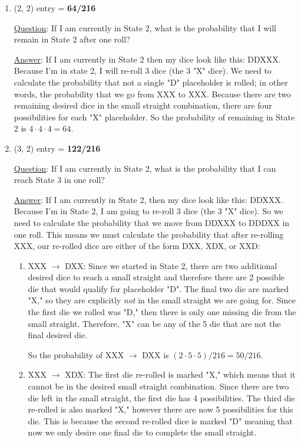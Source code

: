 \documentclass[12pt,a4paper]{article}
\begin{document}
    \begin{enumerate}
        \item (2, 2) entry = \textbf{64/216}

        \underline{Question}: If I am currently in State 2, what is the probability that I will remain in State 2 after one roll?

        \underline{Answer}: If I am currently in State 2 then my dice look like this: DDXXX. Because I'm in state 2, I will re-roll 3 dice (the 3 "X" dice). We need to calculate the probability that not a single "D" placeholder is rolled; in other words, the probability that we go from XXX to XXX.
        Because there are two remaining desired dice in the small straight combination, there are four possibilities for each "X" placeholder. So the probability of remaining in State 2 is $4 \cdot 4 \cdot 4 = 64$.
        \item (3, 2) entry = \textbf{122/216}

        \underline{Question}: If I am currently in State 2, what is the probability that I can reach State 3 in one roll?

        \underline{Answer}: If I am currently in State 2, then my dice look like this: DDXXX. Because I'm in State 2, I am going to re-roll 3 dice (the 3 "X" dice). So we need to calculate the probability that we move from DDXXX to DDDXX in one roll. This means we must calculate the probability that after re-rolling XXX, our re-rolled dice are either of the form DXX, XDX, or XXD:
        \begin{enumerate}
            \item XXX $\rightarrow$ DXX:
            Since we started in State 2, there are two additional desired dice to reach a small straight and therefore there are 2 possible die that would qualify for placeholder "D". The final two die are marked "X," so they are explicitly \textit{not} in the small straight we are going for. Since the first die we rolled was "D," then there is only one missing die from the small straight. Therefore, "X" can be any of the 5 die that are not the final desired die.

            So the probability of XXX $\rightarrow$ DXX is $(2 \cdot 5 \cdot 5)/216 = 50/216$.

            \clearpage

            \item XXX $\rightarrow$ XDX:
            The first die re-rolled is marked "X," which means that it cannot be in the desired small straight combination. Since there are two die left in the small straight, the first die has 4 possibilities. The third die re-rolled is also marked "X," however there are now 5 possibilities for this die. This is because the second re-rolled dice is marked "D" meaning that now we only desire one final die to complete the small straight.


\end{enumerate}
\end{enumerate}
\end{document}
